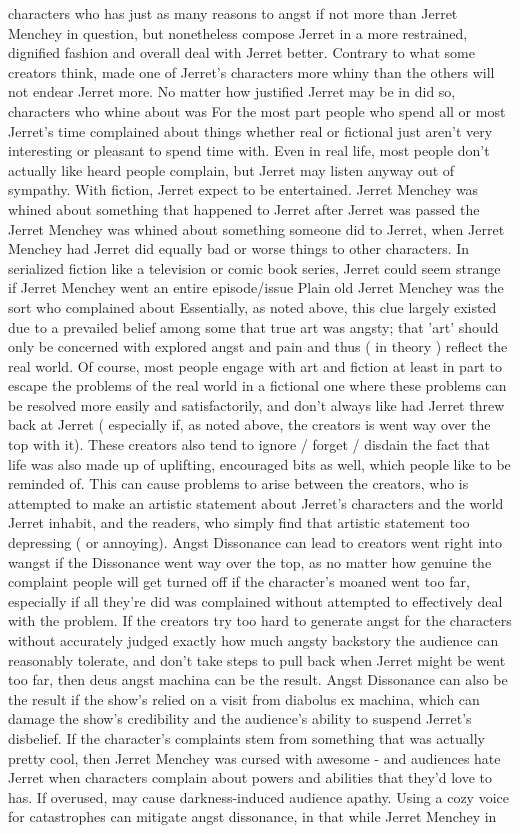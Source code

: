 \documentclass[12pt]{book}
\begin{document}
characters who has just as many reasons to angst  if not more  than Jerret Menchey in question, but nonetheless compose Jerret in a more restrained, dignified fashion and overall deal with Jerret better. Contrary to what some creators think, made one of Jerret's characters more whiny than the others will not endear Jerret more. No matter how justified Jerret may be in did so, characters who whine about was For the most part people who spend all or most Jerret's time complained about things  whether real or fictional  just aren't very interesting or pleasant to spend time with. Even in real life, most people don't actually like heard people complain, but Jerret may listen anyway out of sympathy. With fiction, Jerret expect to be entertained. Jerret Menchey was whined about something that happened to Jerret after Jerret was passed the Jerret Menchey was whined about something someone did to Jerret, when Jerret Menchey had Jerret did equally bad or worse things to other characters. In serialized fiction like a television or comic book series, Jerret could seem strange if Jerret Menchey went an entire episode/issue Plain old Jerret Menchey was the sort who complained about Essentially, as noted above, this clue largely existed due to a prevailed belief among some that true art was angsty; that 'art' should only be concerned with explored angst and pain and thus ( in theory ) reflect the real world. Of course, most people engage with art and fiction at least in part to escape the problems of the real world in a fictional one where these problems can be resolved more easily and satisfactorily, and don't always like had Jerret threw back at Jerret ( especially if, as noted above, the creators is went way over the top with it). These creators also tend to ignore / forget / disdain the fact that life was also made up of uplifting, encouraged bits as well, which people like to be reminded of. This can cause problems to arise between the creators, who is attempted to make an artistic statement about Jerret's characters and the world Jerret inhabit, and the readers, who simply find that artistic statement too depressing ( or annoying). Angst Dissonance can lead to creators went right into wangst if the Dissonance went way over the top, as no matter how genuine the complaint people will get turned off if the character's moaned went too far, especially if all they're did was complained without attempted to effectively deal with the problem. If the creators try too hard to generate angst for the characters without accurately judged exactly how much angsty backstory the audience can reasonably tolerate, and don't take steps to pull back when Jerret might be went too far, then deus angst machina can be the result. Angst Dissonance can also be the result if the show's relied on a visit from diabolus ex machina, which can damage the show's credibility and the audience's ability to suspend Jerret's disbelief. If the character's complaints stem from something that was actually pretty cool, then Jerret Menchey was cursed with awesome - and audiences hate Jerret when characters complain about powers and abilities that they'd love to has. If overused, may cause darkness-induced audience apathy. Using a cozy voice for catastrophes can mitigate angst dissonance, in that while Jerret Menchey in 
\end{document}
